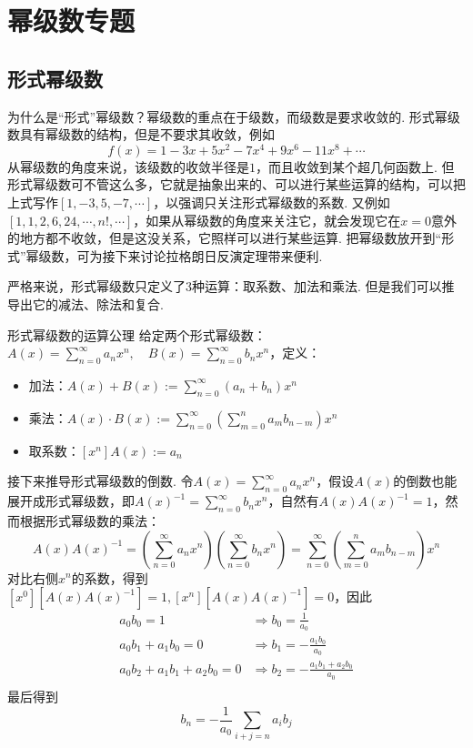 \documentclass[main.tex]{subfiles}
\begin{document}
\section{幂级数专题}

\subsection{形式幂级数}

为什么是“形式”幂级数？幂级数的重点在于级数，而级数是要求收敛的. 形式幂级数具有幂级数的结构，但是不要求其收敛，例如
\[f(x) = 1-3x+5x^2-7x^4+9x^6-11x^8+\cdots\]
从幂级数的角度来说，该级数的收敛半径是\(1\)，而且收敛到某个超几何函数上. 但形式幂级数可不管这么多，它就是抽象出来的、可以进行某些运算的结构，可以把上式写作\([1,-3,5,-7,\cdots]\)，以强调只关注形式幂级数的系数. 又例如\([1,1,2,6,24, \cdots, n!, \cdots]\)，如果从幂级数的角度来关注它，就会发现它在\(x=0\)意外的地方都不收敛，但是这没关系，它照样可以进行某些运算. 把幂级数放开到“形式”幂级数，可为接下来讨论拉格朗日反演定理带来便利.

严格来说，形式幂级数只定义了3种运算：取系数、加法和乘法. 但是我们可以推导出它的减法、除法和复合.
\begin{definition}{形式幂级数的运算公理}
    给定两个形式幂级数：\(\displaystyle{A(x)=\sum_{n=0}^{\infty}a_nx^n, \quad B(x)=\sum_{n=0}^{\infty}b_nx^n}\)，定义：
    \begin{itemize}
        \item [] 加法：\(\displaystyle{A(x)+B(x) := \sum_{n=0}^{\infty}(a_n+b_n)x^n}\)
        \item [] 乘法：\(\displaystyle{A(x) \cdot B(x) := \sum_{n=0}^{\infty}\left(\sum_{m=0}^{n}a_mb_{n-m}\right)x^n}\)
        \item [] 取系数：\(\displaystyle{[x^n]A(x) := a_n}\)
    \end{itemize}
\end{definition}

接下来推导形式幂级数的倒数. 令\(\displaystyle{A(x) = \sum_{n=0}^{\infty}a_nx^n}\)，假设\(A(x)\)的倒数也能展开成形式幂级数，即\(\displaystyle{A(x)^{-1}= \sum_{n=0}^{\infty}b_nx^n}\)，自然有\(A(x)A(x)^{-1}=1\)，然而根据形式幂级数的乘法：
\[A(x)A(x)^{-1} = \left(\sum_{n=0}^{\infty}a_nx^n\right)\left(\sum_{n=0}^{\infty}b_nx^n\right) = \sum_{n=0}^{\infty}\left(\sum_{m=0}^{n}a_mb_{n-m}\right)x^n\]
对比右侧\(x^n\)的系数，得到\([x^0]\left[A(x)A(x)^{-1}\right]=1, [x^n]\left[A(x)A(x)^{-1}\right]=0\)，因此
\begin{align*}
    a_0b_0=1 & \Longrightarrow b_0=\frac{1}{a_0} \\
    a_0b_1+a_1b_0=0 & \Longrightarrow b_1=-\frac{a_1b_0}{a_0} \\
    a_0b_2+a_1b_1+a_2b_0=0 & \Longrightarrow b_2=-\frac{a_1b_1+a_2b_0}{a_0} \\
\end{align*}
最后得到
\[b_n = -\frac{1}{a_0}\sum_{i+j=n}a_ib_j\]
\end{document}
